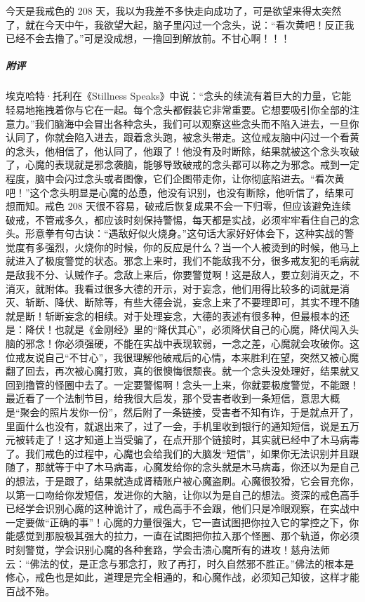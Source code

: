 \begin{case}
    今天是我戒色的 208 天，我以为我差不多快走向成功了，可是欲望来得太突然了，就在今天中午，我欲望大起，脑子里闪过一个念头，说：“看次黄吧！反正我已经不会去撸了。”可是没成想，一撸回到解放前。不甘心啊！！！
    \subparagraph{附评} 埃克哈特·托利在《Stillness Speaks》中说：“念头的续流有着巨大的力量，它能轻易地拖拽着你与它在一起。每个念头都假装它非常重要。它想要吸引你全部的注意力。”我们脑海中会冒出各种念头，我们可以观察这些念头而不陷入进去，一旦你认同了，你就会陷入进去，跟着念头跑，被念头带走。这位戒友脑中闪过一个看黄的念头，他相信了，他认同了，他跟了！他没有及时断除，结果就被这个念头攻破了，心魔的表现就是邪念袭脑，能够导致破戒的念头都可以称之为邪念。戒到一定程度，脑中会闪过念头或者图像，它们企图带走你，让你彻底陷进去。“看次黄吧！”这个念头明显是心魔的怂恿，他没有识别，也没有断除，他听信了，结果可想而知。戒色 208 天很不容易，破戒后恢复成果不会一下归零，但应该避免连续破戒，不管戒多久，都应该时刻保持警惕，每天都是实战，必须牢牢看住自己的念头。形意拳有句古诀：“遇敌好似火烧身。”这句话大家好好体会下，这种实战的警觉度有多强烈，火烧你的时候，你的反应是什么？当一个人被烫到的时候，他马上就进入了极度警觉的状态。邪念上来时，我们不能敌我不分，很多戒友犯的毛病就是敌我不分、认贼作子。念敌上来后，你要警觉啊！这是敌人，要立刻消灭之，不消灭，就附体。我看过很多大德的开示，对于妄念，他们用得比较多的词就是消灭、斩断、降伏、断除等，有些大德会说，妄念上来了不要理即可，其实不理不随就是断！斩断妄念的相续。对于处理妄念，大德的表述有很多种，但最根本的还是：降伏！也就是《金刚经》里的“降伏其心”，必须降伏自己的心魔，降伏闯入头脑的邪念！你必须强硬，不能在实战中表现软弱，一念之差，心魔就会攻破你。这位戒友说自己“不甘心”，我很理解他破戒后的心情，本来胜利在望，突然又被心魔翻了回去，再次被心魔打败，真的很懊悔很颓丧。就一个念头没处理好，结果就又回到撸管的怪圈中去了。一定要警惕啊！念头一上来，你就要极度警觉，不能跟！最近看了一个法制节目，给我很大启发，那个受害者收到一条短信，意思大概是“聚会的照片发你一份”，然后附了一条链接，受害者不知有诈，于是就点开了，里面什么也没有，就退出来了，过了一会，手机里收到银行的通知短信，说是五万元被转走了！这才知道上当受骗了，在点开那个链接时，其实就已经中了木马病毒了。我们戒色的过程中，心魔也会给我们的大脑发“短信”，如果你无法识别并且跟随了，那就等于中了木马病毒，心魔发给你的念头就是木马病毒，你还以为是自己的想法，于是跟了，结果就造成肾精账户被心魔盗刷。心魔很狡猾，它会冒充你，以第一口吻给你发短信，发进你的大脑，让你以为是自己的想法。资深的戒色高手已经学会识别心魔的这种诡计了，戒色高手不会跟，他们只是冷眼观察，在实战中一定要做“正确的事”！心魔的力量很强大，它一直试图把你拉入它的掌控之下，你能感觉到那股极其强大的拉力，一直在试图把你拉入那个怪圈、那个轨道，你必须时刻警觉，学会识别心魔的各种套路，学会击溃心魔所有的进攻！慈舟法师云：“佛法的仗，是正念与邪念打，败了再打，时久自然邪不胜正。”佛法的根本是修心，戒色也是如此，道理是完全相通的，和心魔作战，必须知己知彼，这样才能百战不殆。
\end{case}

